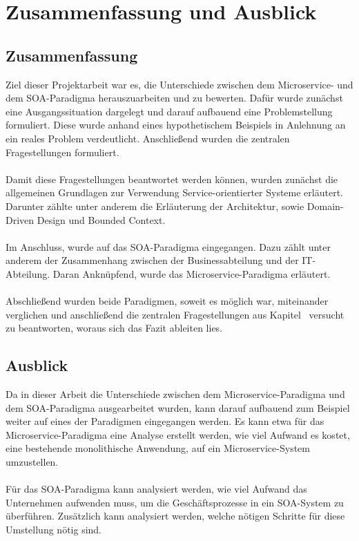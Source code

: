 \chapter{Zusammenfassung und Ausblick}
\label{chap:ZusammenfassungUndAusblick}

\section{Zusammenfassung}
\label{sec:Zusammenfassung}
Ziel dieser Projektarbeit war es, die Unterschiede zwischen dem Microservice- und dem SOA-Paradigma herauszuarbeiten und zu bewerten. Dafür wurde zunächst eine Ausgangssituation dargelegt und darauf aufbauend eine Problemstellung formuliert. Diese wurde anhand eines hypothetischem Beispiels in Anlehnung an ein reales Problem verdeutlicht. Anschließend wurden die zentralen Fragestellungen formuliert.
\\\\
Damit diese Fragestellungen beantwortet werden können, wurden zunächst die allgemeinen Grundlagen zur Verwendung Service-orientierter Systeme erläutert. Darunter zählte unter anderem die Erläuterung der Architektur, sowie Domain-Driven Design und Bounded Context.
\\\\
Im Anschluss, wurde auf das SOA-Paradigma eingegangen. Dazu zählt unter anderem der Zusammenhang zwischen der Businessabteilung und der IT-Abteilung. Daran Anknüpfend, wurde das Microservice-Paradigma erläutert.
\\\\
Abschließend wurden beide Paradigmen, soweit es möglich war, miteinander verglichen und anschließend die zentralen Fragestellungen aus Kapitel \ versucht zu beantworten, woraus sich das Fazit ableiten lies.

\section{Ausblick}
\label{sec:Ausblick}
Da in dieser Arbeit die Unterschiede zwischen dem Microservice-Paradigma und dem SOA-Paradigma ausgearbeitet wurden, kann darauf aufbauend zum Beispiel weiter auf eines der Paradigmen eingegangen werden. Es kann etwa für das Microservice-Paradigma eine Analyse erstellt werden, wie viel Aufwand es kostet, eine bestehende monolithische Anwendung, auf ein Microservice-System umzustellen.
\\\\
Für das SOA-Paradigma kann analysiert werden, wie viel Aufwand das Unternehmen aufwenden muss, um die Geschäftsprozesse in ein SOA-System zu überführen. Zusätzlich kann analysiert werden, welche nötigen Schritte für diese Umstellung nötig sind.